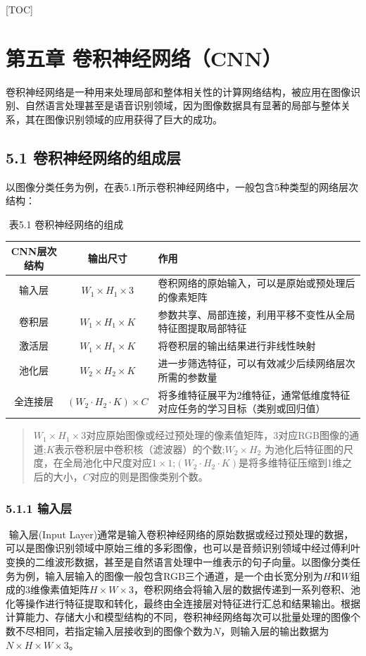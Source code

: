 {[}TOC{]}

\section{第五章
卷积神经网络（CNN）}\label{ux7b2cux4e94ux7ae0-ux5377ux79efux795eux7ecfux7f51ux7edccnn}

​
卷积神经网络是一种用来处理局部和整体相关性的计算网络结构，被应用在图像识别、自然语言处理甚至是语音识别领域，因为图像数据具有显著的局部与整体关系，其在图像识别领域的应用获得了巨大的成功。

\subsection{5.1
卷积神经网络的组成层}\label{ux5377ux79efux795eux7ecfux7f51ux7edcux7684ux7ec4ux6210ux5c42}

​
以图像分类任务为例，在表5.1所示卷积神经网络中，一般包含5种类型的网络层次结构：

​ 表5.1 卷积神经网络的组成

\begin{longtable}[]{@{}ccl@{}}
\toprule
CNN层次结构 & 输出尺寸 & 作用\tabularnewline
\midrule
\endhead
输入层 & \(W_1\times H_1\times 3\) &
卷积网络的原始输入，可以是原始或预处理后的像素矩阵\tabularnewline
卷积层 & \(W_1\times H_1\times K\) &
参数共享、局部连接，利用平移不变性从全局特征图提取局部特征\tabularnewline
激活层 & \(W_1\times H_1\times K\) &
将卷积层的输出结果进行非线性映射\tabularnewline
池化层 & \(W_2\times H_2\times K\) &
进一步筛选特征，可以有效减少后续网络层次所需的参数量\tabularnewline
全连接层 & \((W_2 \cdot H_2 \cdot K)\times C\) &
将多维特征展平为2维特征，通常低维度特征对应任务的学习目标（类别或回归值）\tabularnewline
\bottomrule
\end{longtable}

\begin{quote}
\(W_1\times H_1\times 3\)对应原始图像或经过预处理的像素值矩阵，3对应RGB图像的通道;\(K\)表示卷积层中卷积核（滤波器）的个数;\(W_2\times H_2\)
为池化后特征图的尺度，在全局池化中尺度对应\(1\times 1\);\((W_2 \cdot H_2 \cdot K)\)是将多维特征压缩到1维之后的大小，\(C\)对应的则是图像类别个数。
\end{quote}

\subsubsection{5.1.1 输入层}\label{ux8f93ux5165ux5c42}

​ 输入层(Input
Layer)通常是输入卷积神经网络的原始数据或经过预处理的数据，可以是图像识别领域中原始三维的多彩图像，也可以是音频识别领域中经过傅利叶变换的二维波形数据，甚至是自然语言处理中一维表示的句子向量。以图像分类任务为例，输入层输入的图像一般包含RGB三个通道，是一个由长宽分别为\(H\)和\(W\)组成的3维像素值矩阵\(H\times W \times 3\)，卷积网络会将输入层的数据传递到一系列卷积、池化等操作进行特征提取和转化，最终由全连接层对特征进行汇总和结果输出。根据计算能力、存储大小和模型结构的不同，卷积神经网络每次可以批量处理的图像个数不尽相同，若指定输入层接收到的图像个数为\(N\)，则输入层的输出数据为\(N\times H\times W\times 3\)。

